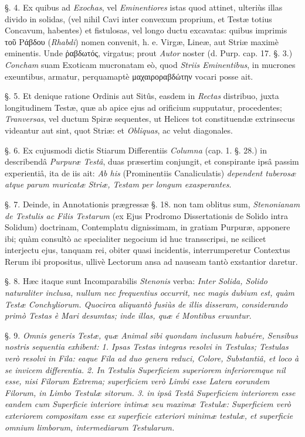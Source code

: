\documentclass[a4paper, 11pt, oneside, polutonikogreek, german]{article}
\begin{document}
§. 4. Ex quibus ad \emph{Exochas}, vel \emph{Eminentiores} istas quod attinet, ulteriùs illas divido in solidas, (vel nihil Cavi inter convexum proprium, et Testæ totius Concavum, habentes) et fistulosas, vel longo ductu excavatas: quibus imprimis τοῦ Ράβδου (\emph{Rhabdi}) nomen convenit, h. e. Virgæ, Lineæ, aut Striæ maximè eminentis. Unde ῥαβδωτός, virgatus; prout \emph{Autor} noster (d. Purp. cap. 17. §. 3.) \emph{Concham} suam Exoticam mucronatam eò, quod \emph{Striis Eminentibus}, in mucrones exeuntibus, armatur, perquamaptè μαχαιροραβδώτην vocari posse ait.

§. 5. Et denique ratione Ordinis aut Sitûs, easdem in \emph{Rectas} distribuo, juxta longitudinem Testæ, quæ ab apice ejus ad orificium supputatur, procedentes; \emph{Tranversas}, vel ductum Spiræ sequentes, ut Helices tot constituendæ extrinsecus videantur aut sint, quot Striæ: et \emph{Obliquas}, ac velut diagonales.

§. 6. Ex cujusmodi dictis Stiarum Differentiis \emph{Columna} (cap. 1. §. 28.) in describendâ \emph{Purpuræ Testâ}, duas præsertim conjungit, et conspirante ipsâ passim experientiâ, ita de iis ait: \emph{Ab his} (Prominentiis Canaliculatis) \emph{dependent tuberosæ atque parum muricatæ Striæ, Testam per longum exasperantes}.

§. 7. Deinde, in Annotationis prægressæ §. 18. non tam oblitus sum, \emph{Stenonianam de Testulis ac Filis Testarum} (ex Ejus Prodromo Dissertationis de Solido intra Solidum) doctrinam, Contemplatu dignissimam, in gratiam Purpuræ, apponere ibi; quàm consultò ac specialiter negocium id huc transscripsi, ne scilicet interjectu ejus, tanquam rei, obiter quasi incidentis, interrumperetur Contextus Rerum ibi propositus, ullivè Lectorum ansa ad nauseam tantò exstantior daretur.

§. 8. Hæc itaque sunt Incomparabilis \emph{Stenonis} verba: \emph{Inter Solida, Solido naturaliter inclusa, nullum nec frequentius occurrit, nec magis dubium est, quàm Testæ Conchyliorum. Quocirca aliquantò fusiùs de illis disseram, considerando primò Testas è Mari desumtas; inde illas, quæ é Montibus eruuntur}.

§. 9. \emph{Omnis generis Testæ, quæ Animal sibi quondam inclusum habuére, Sensibus nostris sequentia exhibent: 1. Ipsas Testas integras resolvi in Testulas; Testulas verò resolvi in Fila: eaque Fila ad duo genera reduci, Colore, Substantiâ, et loco à se invicem differentia. 2. In Testulis Superficiem superiorem inferioremque nil esse, nisi Filorum Extrema; superficiem verò Limbi esse Latera eorundem Filorum, in Limbo Testulæ sitorum. 3. in ipsâ Testâ Superficiem interiorem esse eandem cum Superficie interiore intimæ seu maximæ Testulæ: Superficiem verò exteriorem compositam esse ex superficie exteriori minimæ testulæ, et superficie omnium limborum, intermediarum Testularum.}
\end{document}
